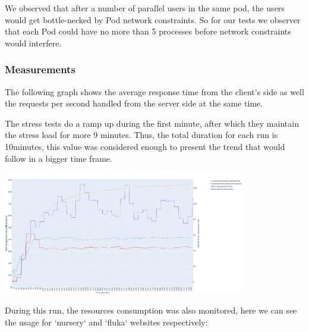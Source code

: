 We observed that after a number of parallel users in the same pod, the users would get bottle-necked by Pod network constraints. So for our tests we observer that each Pod could have no more than 5 processes before network constraints would interfere.


\subsubsection{Measurements}

The following graph shows the average response time from the client's side as well the requests per second handled from the server side at the same time. 

The stress tests do a ramp up during the first minute, after which they maintain the stress load for more 9 minutes.
Thus, the total duration for each run is 10minutes, this value was considered enough to present the trend that would follow in a bigger time frame.

\includegraphics[width=400]{figures/experiment-figures/critical_run.png}

During this run, the resources consumption was also monitored, here we can see the usage for `nursery` and `fluka` websites respectively:

